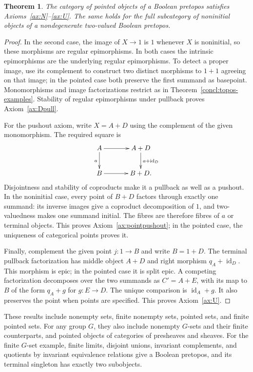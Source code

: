 \documentclass[11pt,a4paper]{article}
\theoremstyle{plain}
\newtheorem{theorem}{Theorem}[section]
\theoremstyle{definition}
\theoremstyle{remark}
\newcommand{\id}{\operatorname{id}}
\begin{document}
\begin{theorem}\label{concl:pretopos-examples}
The category of pointed objects of a Boolean pretopos satisfies
Axioms~\ref{ax:N}--\ref{ax:U}. The same holds for the full
subcategory of noninitial objects of a nondegenerate two-valued
Boolean pretopos.
\end{theorem}
\begin{proof}
In the second case, the image of $X\to1$ is $1$ whenever
$X$ is noninitial, so these morphisms are regular epimorphisms.
In both cases the intrinsic epimorphisms are the underlying regular
epimorphisms. To detect a proper image, use its complement to
construct two distinct morphisms to $1+1$ agreeing on that image;
in the pointed case both preserve the first summand as basepoint.
Monomorphisms and image factorizations restrict as in
Theorem~\ref{concl:topos-examples}. Stability of regular
epimorphisms under pullback proves Axiom~\ref{ax:Dpull}.

For the pushout axiom, write $X=A+D$ using the complement of
the given monomorphism. The required square is
\[
\xymatrix@C=3.5em@R=2.3em{
A\ar[r]\ar[d]_a&A+D\ar[d]^{a+\id_D}\\
B\ar[r]&B+D.
}
\]
Disjointness and stability of coproducts make it a pullback as
well as a pushout. In the noninitial case, every point of $B+D$
factors through exactly one summand: its inverse images give a
coproduct decomposition of $1$, and two-valuedness makes one
summand initial. The fibres are therefore fibres of $a$ or
terminal objects. This proves Axiom~\ref{ax:pointpushout};
in the pointed case, the uniqueness of categorical points proves it.

Finally, complement the given point $j:1\to B$ and write
$B=1+D$. The terminal pullback factorization has middle object
$A+D$ and right morphism $q_A+\id_D$. This morphism is epic;
in the pointed case it is split epic. A competing factorization
decomposes over the two summands as $C'=A+E$, with its map to
$B$ of the form $q_A+g$ for $g:E\to D$. The unique comparison
is $\id_A+g$. It also preserves the point when points are
specified. This proves Axiom~\ref{ax:U}.
\end{proof}

These results include nonempty sets, finite nonempty sets, pointed
sets, and finite pointed sets. For any group $G$, they also include nonempty $G$-sets
and their finite counterparts, and pointed objects of categories
of presheaves and sheaves. For the finite $G$-set example, finite
limits, disjoint unions, invariant complements, and quotients by
invariant equivalence relations give a Boolean pretopos, and its
terminal singleton has exactly two subobjects.
\end{document}
